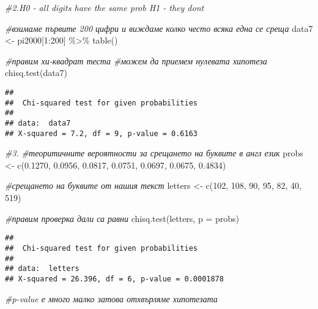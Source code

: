 \documentclass[
]{article}
\newenvironment{Shaded}{\begin{snugshade}}{\end{snugshade}}
\newcommand{\AttributeTok}[1]{\textcolor[rgb]{0.77,0.63,0.00}{#1}}
\newcommand{\CommentTok}[1]{\textcolor[rgb]{0.56,0.35,0.01}{\textit{#1}}}
\newcommand{\DecValTok}[1]{\textcolor[rgb]{0.00,0.00,0.81}{#1}}
\newcommand{\FloatTok}[1]{\textcolor[rgb]{0.00,0.00,0.81}{#1}}
\newcommand{\FunctionTok}[1]{\textcolor[rgb]{0.00,0.00,0.00}{#1}}
\newcommand{\NormalTok}[1]{#1}
\newcommand{\OtherTok}[1]{\textcolor[rgb]{0.56,0.35,0.01}{#1}}
\newcommand{\SpecialCharTok}[1]{\textcolor[rgb]{0.00,0.00,0.00}{#1}}
\begin{document}
\begin{Shaded}
\begin{Highlighting}[]
\CommentTok{\#2.H0 {-} all digits have the same prob H1 {-} they don\textquotesingle{}t  }

\CommentTok{\#взимаме първите 200 цифри и виждаме колко често всяка една се среща}
\NormalTok{data7 }\OtherTok{\textless{}{-}}\NormalTok{ pi2000[}\DecValTok{1}\SpecialCharTok{:}\DecValTok{200}\NormalTok{] }\SpecialCharTok{\%\textgreater{}\%} \FunctionTok{table}\NormalTok{()}

\CommentTok{\#правим хи{-}квадрат теста}
\CommentTok{\#можем да приемем нулевата хипотеза}
\FunctionTok{chisq.test}\NormalTok{(data7)}
\end{Highlighting}
\end{Shaded}

\begin{verbatim}
## 
##  Chi-squared test for given probabilities
## 
## data:  data7
## X-squared = 7.2, df = 9, p-value = 0.6163
\end{verbatim}

\begin{Shaded}
\begin{Highlighting}[]
\CommentTok{\#3.}
\CommentTok{\#теоритичните вероятности за срещането на буквите в англ език}
\NormalTok{probs }\OtherTok{\textless{}{-}} \FunctionTok{c}\NormalTok{(}\FloatTok{0.1270}\NormalTok{, }\FloatTok{0.0956}\NormalTok{, }\FloatTok{0.0817}\NormalTok{, }\FloatTok{0.0751}\NormalTok{, }\FloatTok{0.0697}\NormalTok{, }\FloatTok{0.0675}\NormalTok{, }\FloatTok{0.4834}\NormalTok{)}

\CommentTok{\#срещането на буквите от нашия текст}
\NormalTok{letters }\OtherTok{\textless{}{-}} \FunctionTok{c}\NormalTok{(}\DecValTok{102}\NormalTok{, }\DecValTok{108}\NormalTok{, }\DecValTok{90}\NormalTok{, }\DecValTok{95}\NormalTok{, }\DecValTok{82}\NormalTok{, }\DecValTok{40}\NormalTok{, }\DecValTok{519}\NormalTok{)}

\CommentTok{\#правим проверка дали са равни}
\FunctionTok{chisq.test}\NormalTok{(letters, }\AttributeTok{p =}\NormalTok{ probs)}
\end{Highlighting}
\end{Shaded}

\begin{verbatim}
## 
##  Chi-squared test for given probabilities
## 
## data:  letters
## X-squared = 26.396, df = 6, p-value = 0.0001878
\end{verbatim}

\begin{Shaded}
\begin{Highlighting}[]
\CommentTok{\#p{-}value е много малко затова отхвърляме хипотезата}
\end{Highlighting}
\end{Shaded}
\end{document}
